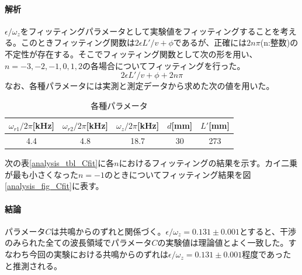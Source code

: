 \paragraph{解析}
$\epsilon/\omega_z$をフィッティングパラメータとして実験値をフィッティングすることを考える。このときフィッティング関数は$2\epsilon L'/v +\phi$であるが、正確には$2n\pi$(n:整数)の不定性が存在する。そこでフィッティング関数として次の形を用い、$n=-3,-2,-1,0,1,2$の各場合についてフィッティングを行った。
\begin{equation}
2\epsilon L'/v +\phi+2n\pi
\end{equation}
なお、各種パラメータには実測と測定データから求めた次の値を用いた。
\begin{table}[h]
\centering
\caption{各種パラメータ}\label{analysis_tbl_parameter}
\begin{tabular}{ccccc}
$\omega_{r1}/2\pi$[kHz]&$\omega_{r2}/2\pi$[kHz]&$\omega_{z}/2\pi$[kHz]&$d$[mm]&$L'$[mm]\\ \hline
4.4&4.8&18.7&30&273
\end{tabular}
\end{table}

次の表\ref{analysis_tbl_Cfit}に各$n$におけるフィッティングの結果を示す。カイ二乗が最も小さくなった$n=-1$のときについてフィッティング結果を図\ref{analysis_fig_Cfit}に表す。

\paragraph{結論}
パラメータ$C$は共鳴からのずれと関係づく。$\epsilon/\omega_z=0.131\pm0.001$とすると、干渉のみられた全ての波長領域でパラメータ$C$の実験値は理論値とよく一致した。すなわち今回の実験における共鳴からのずれは$\epsilon/\omega_z=0.131\pm0.001$程度であったと推測される。

